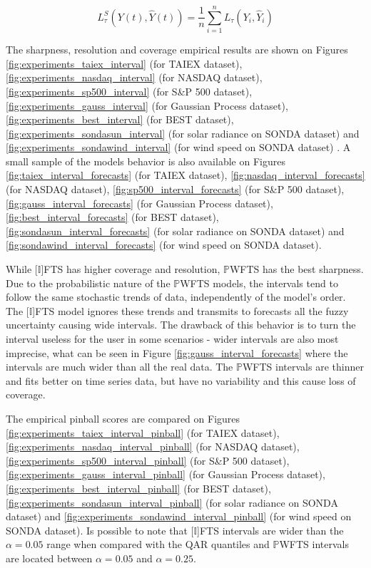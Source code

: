 \begin{equation}
L_\tau^S(Y(t),\hat{Y}(t)) = \frac{1}{n}\sum_{i=1}^n L_\tau(Y_i,\hat{Y}_i)
\label{eqn:pinball_score}
\end{equation}

The sharpness, resolution and coverage empirical results are shown on Figures  \ref{fig:experiments_taiex_interval} (for TAIEX dataset),  \ref{fig:experiments_nasdaq_interval} (for NASDAQ dataset),  \ref{fig:experiments_sp500_interval} (for S\&P 500 dataset),  \ref{fig:experiments_gauss_interval} (for Gaussian Process dataset),  \ref{fig:experiments_best_interval} (for BEST dataset),  \ref{fig:experiments_sondasun_interval} (for solar radiance on SONDA dataset) and \ref{fig:experiments_sondawind_interval} (for wind speed on SONDA dataset) . A small sample of the models behavior is also available on Figures  \ref{fig:taiex_interval_forecasts} (for TAIEX dataset),  \ref{fig:nasdaq_interval_forecasts} (for NASDAQ dataset),  \ref{fig:sp500_interval_forecasts} (for S\&P 500 dataset),  \ref{fig:gauss_interval_forecasts} (for Gaussian Process dataset),  \ref{fig:best_interval_forecasts} (for BEST dataset),  \ref{fig:sondasun_interval_forecasts} (for solar radiance on SONDA dataset) and \ref{fig:sondawind_interval_forecasts} (for wind speed on SONDA dataset). 

While [$\mathbb{I}$]FTS has higher coverage and resolution, $\mathbb{P}$WFTS has the best sharpness. Due to the probabilistic nature of the $\mathbb{P}$WFTS models, the intervals tend to follow the same stochastic trends of data, independently of the model's order. The [$\mathbb{I}$]FTS model ignores these trends and transmits to forecasts all the fuzzy uncertainty causing wide intervals. The drawback of this behavior is to turn the interval useless for the user in some scenarios - wider intervals are also most imprecise, what can be seen in Figure \ref{fig:gauss_interval_forecasts} where the intervals are much wider than all the real data. The $\mathbb{P}$WFTS intervals are thinner and fits better on time series data, but have no variability and this cause loss of coverage. 

The empirical pinball scores are compared on Figures \ref{fig:experiments_taiex_interval_pinball} (for TAIEX dataset),  \ref{fig:experiments_nasdaq_interval_pinball} (for NASDAQ dataset),  \ref{fig:experiments_sp500_interval_pinball} (for S\&P 500 dataset),  \ref{fig:experiments_gauss_interval_pinball} (for Gaussian Process dataset),  \ref{fig:experiments_best_interval_pinball} (for BEST dataset),  \ref{fig:experiments_sondasun_interval_pinball} (for solar radiance on SONDA dataset) and \ref{fig:experiments_sondawind_interval_pinball} (for wind speed on SONDA dataset). Is possible to note that [$\mathbb{I}$]FTS intervals are wider than the $\alpha=0.05$ range when compared with the QAR quantiles and  $\mathbb{P}$WFTS intervals are located between $\alpha=0.05$ and $\alpha=0.25$.

